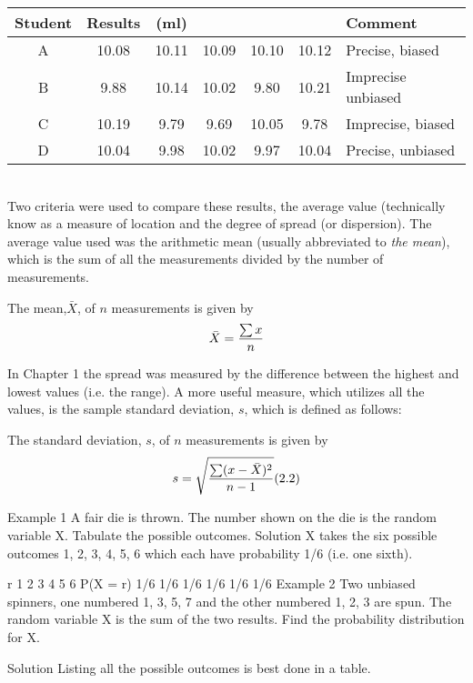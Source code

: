 \begin{tabular}{|c|ccccc|l|}
	\hline
	Student & Results  & (ml) &  &  &  &Comment \\ \hline
	A & 10.08 & 10.11 &10.09 &10.10&10.12 & Precise, biased\\ \hline
	B & 9.88 &10.14& 10.02 &9.80& 10.21& Imprecise unbiased\\ \hline
	C & 10.19 &9.79& 9.69 &10.05& 9.78 & Imprecise, biased\\ \hline
	D & 10.04 &9.98 &10.02 &9.97 &10.04 & Precise, unbiased \\
	\hline
\end{tabular}\\




Two criteria were used to compare these results, the average value (technically know
as a measure of location and the degree of spread (or dispersion). The average value
used was the arithmetic mean (usually abbreviated to \emph{the mean}), which is the sum
of all the measurements divided by the number of measurements.


The mean,$\bar{X}$, of $n$ measurements is given by \[ \bar{X}  = {\sum{x} \over n} \]

In Chapter 1 the spread was measured by the difference between the highest and
lowest values (i.e. the range). A more useful measure, which utilizes all the values, is the sample
standard deviation, $s$, which is defined as follows:

The standard deviation, $s$, of $n$ measurements is given by
\[s=  \sqrt{ {\sum(x-\bar{X})^2 \over n-1} }  (2.2) \]









Example 1
A fair die is thrown. The number shown on the die is the random variable X. Tabulate the possible outcomes.
Solution
X takes the six possible outcomes 1, 2, 3, 4, 5, 6 which each have probability 1/6 (i.e. one sixth).

r 	1 	2 	3 	4 	5 	6
P(X = r)	1/6 	1/6 	1/6 	1/6 	1/6 	1/6
Example 2
Two unbiased spinners, one numbered 1, 3, 5, 7 and the other numbered 1, 2, 3 are spun. The random variable X is the sum of the two results.
Find the probability distribution for X.



Solution
Listing all the possible outcomes is best done in a table.

